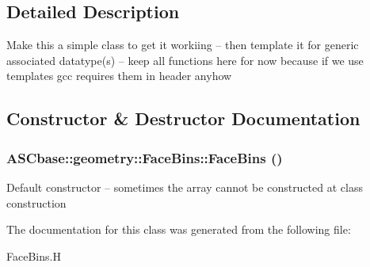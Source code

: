 \subsection{Detailed Description}
Make this a simple class to get it workiing -- then template it for generic associated datatype(s) -- keep all functions here for now because if we use templates gcc requires them in header anyhow 



\subsection{Constructor \& Destructor Documentation}
\subsubsection{\setlength{\rightskip}{0pt plus 5cm}ASCbase::geometry::Face\-Bins::Face\-Bins ()\hspace{0.3cm}{\tt  [inline]}}\label{classASCbase_1_1geometry_1_1FaceBins_b059699dc81548d3ee80cb8d194a4445}


Default constructor -- sometimes the array cannot be constructed at class construction 

The documentation for this class was generated from the following file:\begin{CompactItemize}
\item 
Face\-Bins.H\end{CompactItemize}
